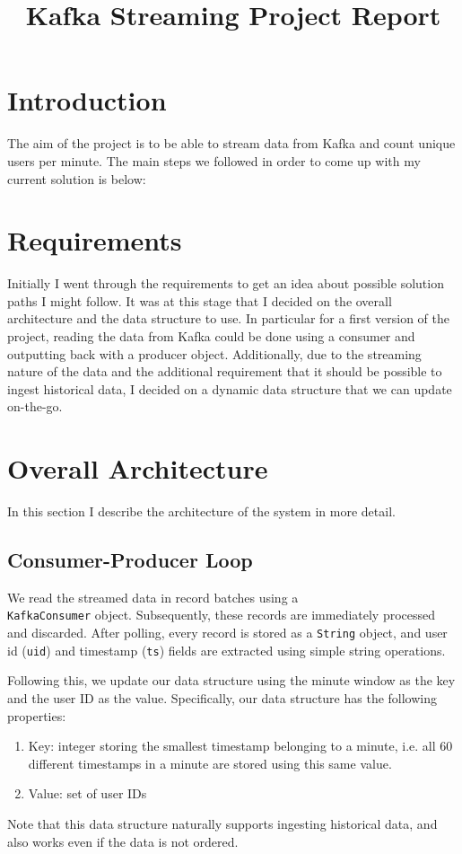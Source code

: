 \documentclass[letterpaper]{article}
\title{Kafka Streaming Project Report}
\begin{document}
%
\maketitle
%

\section{Introduction}
The aim of the project is to be able to stream data from Kafka and count unique users per minute.
The main steps we followed in order to come up with my current solution is below:

\section{Requirements}
Initially I went through the requirements to get an idea about possible solution paths I might follow.
It was at this stage that I decided on the overall architecture and the data structure to use.
In particular for a first version of the project, reading the data from Kafka could be done using a consumer and outputting back with a producer object.
Additionally, due to the streaming nature of the data and the additional requirement that it should be possible to ingest historical data, I decided on a dynamic data structure that we can update on-the-go.

\section{Overall Architecture}
In this section I describe the architecture of the system in more detail.

\subsection{Consumer-Producer Loop}
We read the streamed data in record batches using a\\
\verb|KafkaConsumer| object.
Subsequently, these records are immediately processed and discarded.
After polling, every record is stored as a \verb|String| object, and user id (\verb|uid|) and timestamp (\verb|ts|) fields are extracted using simple string operations.

Following this, we update our data structure using the minute window as the key and the user ID as the value.
Specifically, our data structure has the following properties:
\begin{enumerate}
    \item Key: integer storing the smallest timestamp belonging to a minute, i.e. all 60 different timestamps in a minute are stored using this same value.
    \item Value: set of user IDs
\end{enumerate}
Note that this data structure naturally supports ingesting historical data, and also works even if the data is not ordered.
\end{document}
